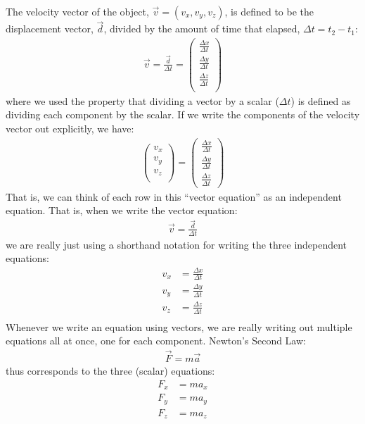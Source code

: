  The velocity vector of the object, $\vec v=(v_x, v_y, v_z)$, is defined to be the displacement vector, $\vec d$, divided by the amount of time that elapsed, $\Delta t=t_2-t_1$:
\begin{align*}
\vec v = \frac{\vec d}{\Delta t}=\begin{pmatrix}
           \frac{\Delta x}{\Delta t} \\
           \frac{\Delta y}{\Delta t} \\
           \frac{\Delta z}{\Delta t} \\
         \end{pmatrix}
\end{align*}
where we used the property that dividing a vector by a scalar ($\Delta t$) is defined as dividing each component by the scalar. If we write the components of the velocity vector out explicitly, we have:
\begin{align*}
\begin{pmatrix}
           v_x \\
           v_y \\
           v_z \\
         \end{pmatrix} = \begin{pmatrix}
           \frac{\Delta x}{\Delta t} \\
           \frac{\Delta y}{\Delta t} \\
           \frac{\Delta z}{\Delta t}
         \end{pmatrix}
\end{align*}
That is, we can think of each row in this ``vector equation'' as an independent equation. That is, when we write the vector equation:
\begin{align*}
\vec v = \frac{\vec d}{\Delta t}
\end{align*}
we are really just using a shorthand notation for writing the three independent equations:
\begin{align*}
v_x &= \frac{\Delta x}{\Delta t} \\
v_y &= \frac{\Delta y}{\Delta t} \\
v_z &= \frac{\Delta z}{\Delta t} \\
\end{align*}
Whenever we write an equation using vectors, we are really writing out multiple equations all at once, one for each component. Newton's Second Law:
\begin{align*}
\vec F = m \vec a
\end{align*}
thus corresponds to the three (scalar) equations:
\begin{align*}
F_x &= ma_x\\
F_y &= ma_y\\
F_z &= ma_z\\
\end{align*}
